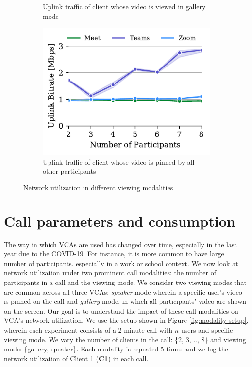 \begin{figure}[ht]
\begin{subfigure}[t]{.33\textwidth}
    \caption{Uplink traffic of client whose video is viewed in gallery mode}
    \label{fig:gallery-send}
\end{subfigure}
\hfill
\begin{subfigure}[t]{.33\textwidth}
  \centering
   \captionsetup{width=.9\linewidth}
    \includegraphics[width=1\textwidth,keepaspectratio]{../figures/modality/speaker_send.pdf}
    \caption{Uplink traffic of client whose video is pinned by all other participants}
    \label{fig:speaker-send}
\end{subfigure}
\caption{Network utilization in different viewing modalities}
\label{fig:viewing-mode}
\end{figure}

\section{Call parameters and 
consumption}\label{sec:usage_modality}






The way in which VCAs are used has changed over time, especially in the last year due to the COVID-19. For instance, it is more common to have large number of participants, especially in a work or school context. We now look at network utilization under two prominent call modalities: the number of participants in a call and the viewing mode. We consider two viewing modes that are common across all three VCAs: \textit{speaker} mode wherein a specific user's video is pinned on the call and \textit{gallery} mode, in which all participants' video are shown on the screen. Our goal is to understand the impact of these call modalities on VCA's network utilization. We use the setup shown in Figure \ref{fig:modality-setup}, wherein each experiment consists of a 2-minute call with $n$ users and specific viewing mode. We vary the number of clients in the call: \{2, 3, .., 8\} and viewing mode: \{gallery, speaker\}. Each modality is repeated 5 times and we log the network utilization of Client 1 (\textbf{C1}) in each call. 

